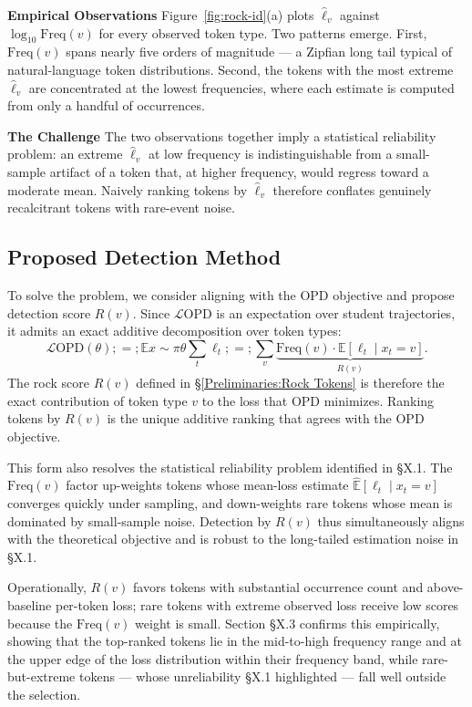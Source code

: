 \textbf{Empirical Observations} Figure~\ref{fig:rock-id}(a) plots $\widehat\ell_v$ against $\log_{10}\mathrm{Freq}(v)$ for every observed token type. Two patterns emerge. First, $\mathrm{Freq}(v)$ spans nearly five orders of magnitude — a Zipfian long tail typical of natural-language token distributions. Second, the tokens with the most extreme $\widehat\ell_v$ are concentrated at the lowest frequencies, where each estimate is computed from only a handful of occurrences.

\textbf{The Challenge} The two observations together imply a statistical reliability problem: an extreme $\widehat\ell_v$ at low frequency is indistinguishable from a small-sample artifact of a token that, at higher frequency, would regress toward a moderate mean. Naively ranking tokens by $\widehat\ell_v$ therefore conflates genuinely recalcitrant tokens with rare-event noise. 

\subsection{Proposed Detection Method}

To solve the problem, we consider aligning with the OPD objective and propose detection score $R(v)$. Since $\mathcal{L}{\text{OPD}}$ is an expectation over student trajectories, it admits an exact additive decomposition over token types:
\begin{equation}
\mathcal{L}{\text{OPD}}(\theta)
;=;
\mathbb{E}{x \sim \pi\theta} \sum_{t} \ell_t
;=;
\sum_{v}
\underbrace{\mathrm{Freq}(v) \cdot \mathbb{E}[\ell_t \mid x_t = v]}_{R(v)}.
\end{equation}
The rock score $R(v)$ defined in §\ref{Preliminaries:Rock Tokens} is therefore the exact contribution of token type $v$ to the loss that OPD minimizes. Ranking tokens by $R(v)$ is the unique additive ranking that agrees with the OPD objective.

This form also resolves the statistical reliability problem identified in §X.1. The $\mathrm{Freq}(v)$ factor up-weights tokens whose mean-loss estimate $\widehat{\mathbb{E}}[\ell_t \mid x_t = v]$ converges quickly under sampling, and down-weights rare tokens whose mean is dominated by small-sample noise. Detection by $R(v)$ thus simultaneously aligns with the theoretical objective and is robust to the long-tailed estimation noise in §X.1.

Operationally, $R(v)$ favors tokens with substantial occurrence count and above-baseline per-token loss; rare tokens with extreme observed loss receive low scores because the $\mathrm{Freq}(v)$ weight is small. Section §X.3 confirms this empirically, showing that the top-ranked tokens lie in the mid-to-high frequency range and at the upper edge of the loss distribution within their frequency band, while rare-but-extreme tokens — whose unreliability §X.1 highlighted — fall well outside the selection.


